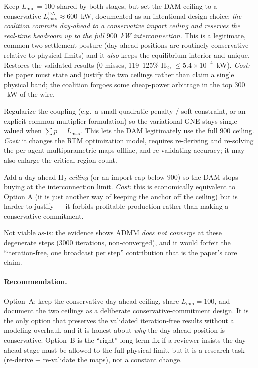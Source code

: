 \documentclass[11pt, letterpaper]{article}
\begin{document}
\begin{description}[leftmargin=1.4em]
\item[\textbf{Option A --- conservative day-ahead ceiling (recommended).}]
Keep $L_{\min}=100$ shared by both stages, but set the DAM ceiling to a conservative
$L_{\max}^{\mathrm{DA}}\approx600$~kW, documented as an intentional design choice: \emph{the
coalition commits day-ahead to a conservative import ceiling and reserves the real-time headroom up
to the full $900$~kW interconnection.} This is a legitimate, common two-settlement posture
(day-ahead positions are routinely conservative relative to physical limits) and it \emph{also}
keeps the equilibrium interior and unique. Restores the validated results (0 misses, 119--125\%
H$_2$, $\le5.4\!\times\!10^{-4}$~kW). \emph{Cost:} the paper must state and justify the two
ceilings rather than claim a single physical band; the coalition forgoes some cheap-power arbitrage
in the top $300$~kW of the wire.

\item[\textbf{Option B --- make the RT equilibrium well-posed on the boundary.}]
Regularize the coupling (e.g.\ a small quadratic penalty / soft constraint, or an explicit
common-multiplier formulation) so the variational GNE stays single-valued when $\sum p=L_{\max}$.
This lets the DAM legitimately use the full $900$ ceiling. \emph{Cost:} it changes the RTM
optimization model, requires re-deriving and re-solving the per-agent multiparametric maps offline,
and re-validating accuracy; it may also enlarge the critical-region count.

\item[\textbf{Option C --- cap day-ahead over-production.}]
Add a day-ahead H$_2$ \emph{ceiling} (or an import cap below $900$) so the DAM stops buying at the
interconnection limit. \emph{Cost:} this is economically equivalent to Option A (it is just another
way of keeping the anchor off the ceiling) but is harder to justify --- it forbids profitable
production rather than making a conservative commitment.

\item[\textbf{Option D --- accept ADMM at binding-coupling steps.}]
Not viable as-is: the evidence shows ADMM \emph{does not converge} at these degenerate steps (3000
iterations, non-converged), and it would forfeit the ``iteration-free, one broadcast per step''
contribution that is the paper's core claim.
\end{description}

\paragraph{Recommendation.} Option~A: keep the conservative day-ahead ceiling, share $L_{\min}=100$,
and document the two ceilings as a deliberate conservative-commitment design. It is the only option
that preserves the validated iteration-free results without a modeling overhaul, and it is honest
about \emph{why} the day-ahead position is conservative. Option~B is the ``right'' long-term fix if a
reviewer insists the day-ahead stage must be allowed to the full physical limit, but it is a research
task (re-derive + re-validate the maps), not a constant change.
\end{document}

